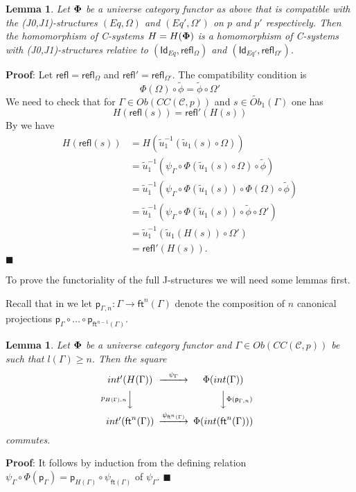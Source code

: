 \documentclass[12pt]{article}
\numberwithin{equation}{section}
\newenvironment{myproof}{{\bf Proof}:}{$\blacksquare$ \vskip 5mm }
\newtheorem{lemma}[proposition]{Lemma}
\newcommand{\sr}{\rightarrow}
\newcommand{\wt}{\widetilde}
\newcommand{\toCC}{CC} %
\newcommand{\C}{{\mathcal C}}  %
\newcommand{\ft}{\mathsf{ft}}
\newcommand{\p}{\mathsf{p}}
\newcommand{\Id}{\mathsf{Id}} %
\newcommand{\refl}{\mathsf{refl}}
\newcommand{\Obwt}{\wt{Ob}}
\begin{document}
\begin{lemma}
\label{2015.04.12.l2} Let ${\bf\Phi}$ be a universe category functor as above
that is compatible with the (J0,J1)-structures $(Eq,\Omega)$ and
$(Eq',\Omega')$ on $p$ and $p'$ respectively. Then the homomorphism of
C-systems $H=H({\bf\Phi})$ is a homomorphism of C-systems with
(J0,J1)-structures relative to $(\Id_{Eq},\refl_{\Omega})$ and
$(\Id_{Eq'},\refl_{\Omega'})$.
\end{lemma}
%
\begin{myproof}
Let $\refl=\refl_{\Omega}$ and $\refl'=\refl_{\Omega'}$. The compatibility
condition is
%
$$\Phi(\Omega)\circ\wt{\phi}=\wt{\phi}\circ\Omega'$$
%
We need to check that for $\Gamma\in Ob(\toCC({\C},p))$ and $s\in
\Obwt_1(\Gamma)$ one has
%
$$H(\refl(s))=\refl'(H(s))$$
%
By \cite[Lemma 6.1(2)]{fromunivwithPi} we have
%
\begin{align*}
  H(\refl(s))
    & = H(\wt{u}_1^{-1}(\wt{u}_1(s)\circ\Omega)) \\
    & = \wt{u}_1^{-1}(\psi_{\Gamma}\circ\Phi(\wt{u}_1(s)\circ\Omega)\circ\wt{\phi}) \\
    & = \wt{u}_1^{-1}(\psi_{\Gamma}\circ\Phi(\wt{u}_1(s))\circ\Phi(\Omega)\circ \wt{\phi}) \\
    & = \wt{u}_1^{-1}(\psi_{\Gamma}\circ\Phi(\wt{u}_1(s))\circ\wt{\phi}\circ\Omega') \\
    & = \wt{u}_1^{-1}(\wt{u}_1(H(s))\circ\Omega') \\
    & = \refl'(H(s)).
\end{align*}
\end{myproof}
%

To prove the functoriality of the full J-structures we will need some lemmas
first.

Recall that in \cite{Csubsystems} we let $\p_{\Gamma,n}:\Gamma\sr \ft^n(\Gamma)$
denote the composition of $n$ canonical projections $\p_{\Gamma}\circ \dots\circ
\p_{\ft^{n-1}(\Gamma)}$.
%
\begin{lemma}
\label{2015.05.10.l1} Let ${\bf\Phi}$ be a universe category functor and
$\Gamma\in Ob(\toCC({\C},p))$ be such that $l(\Gamma)\ge n$. Then the
square
%
$$
\begin{CD}
int'(H(\Gamma)) @>\psi_{\Gamma}>> \Phi(int(\Gamma))\\ @Vp_{H(\Gamma),n} VV
@VV\Phi(\p_{\Gamma,n})V\\ int'(\ft^n(\Gamma)) @>\psi_{\ft^n(\Gamma)}>>
\Phi(int(\ft^n(\Gamma)))
\end{CD}
$$
%
commutes.
\end{lemma}
%
\begin{myproof}
It follows by induction from the defining relation
$\psi_{\Gamma}\circ \Phi(\p_{\Gamma})=\p_{H(\Gamma)}\circ \psi_{\ft(\Gamma)}$
of $\psi_{\Gamma}$.
\end{myproof}
\end{document}
